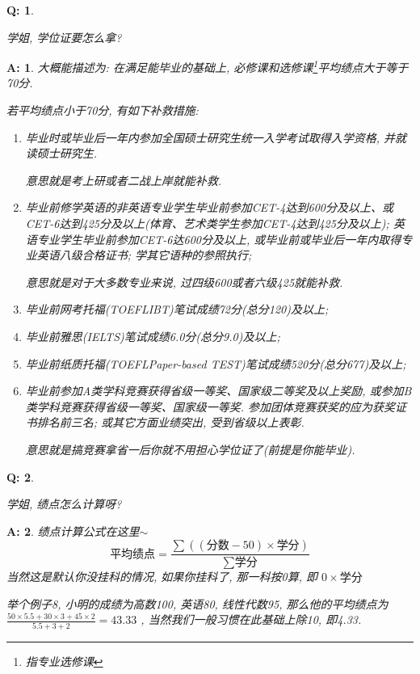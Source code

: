 \documentclass[UTF8]{ctexart}
\theoremstyle{nonumberplain}
\newtheorem{Q}{Q:}
\theoremstyle{nonumberplain}
\newtheorem{A}{A:}
\newcommand{\FAQ}[2]{
    \begin{Q}
        #1
    \end{Q}
    \begin{A}
        #2
    \end{A}
}
\begin{document}
    \FAQ{\hypertarget{5}{学姐, 学位证要怎么拿?}}{
        大概能描述为: 在满足能毕业的基础上, 必修课和选修课\footnote{指专业选修课}平均绩点大于等于70分.

        若平均绩点小于70分, 有如下补救措施:
        \begin{enumerate}
            \item 毕业时或毕业后一年内参加全国硕士研究生统一入学考试取得入学资格, 并就读硕士研究生. 
            
            意思就是考上研或者二战上岸就能补救.
            \item 毕业前修学英语的非英语专业学生毕业前参加CET-4达到600分及以上、或CET-6达到425分及以上(体育、艺术类学生参加CET-4达到425分及以上); 
            英语专业学生毕业前参加CET-6达600分及以上, 或毕业前或毕业后一年内取得专业英语八级合格证书; 学其它语种的参照执行; 
            
            意思就是对于大多数专业来说, 过四级600或者六级425就能补救.
            \item 毕业前网考托福(TOEFLIBT)笔试成绩72分(总分120)及以上;
            \item 毕业前雅思(IELTS)笔试成绩6.0分(总分9.0)及以上;
            \item 毕业前纸质托福(TOEFLPaper-based TEST)笔试成绩520分(总分677)及以上;
            \item 毕业前参加A类学科竞赛获得省级一等奖、国家级二等奖及以上奖励, 或参加B类学科竞赛获得省级一等奖、国家级一等奖. 
            参加团体竞赛获奖的应为获奖证书排名前三名; 或其它方面业绩突出, 受到省级以上表彰. 
            
            意思就是搞竞赛拿省一后你就不用担心学位证了(前提是你能毕业).
        \end{enumerate}
    }

    \FAQ{\hypertarget{6}{学姐, 绩点怎么计算呀?}}{
        绩点计算公式在这里$\sim$
        \begin{equation*}
            \text{平均绩点}=\frac{\sum((\text{分数}-50)\times \text{学分})}{\sum\text{学分}}
        \end{equation*}
        当然这是默认你没挂科的情况, 如果你挂科了, 那一科按0算, 即 $0\times\text{学分}$

        举个例子8, 小明的成绩为高数100, 英语80, 线性代数95, 那么他的平均绩点为 $\frac{50\times 5.5+30\times 3+45\times 2}{5.5+3+2} = 43.33$ , 当然我们一般习惯在此基础上除10, 即4.33.
    }
    
\end{document}
